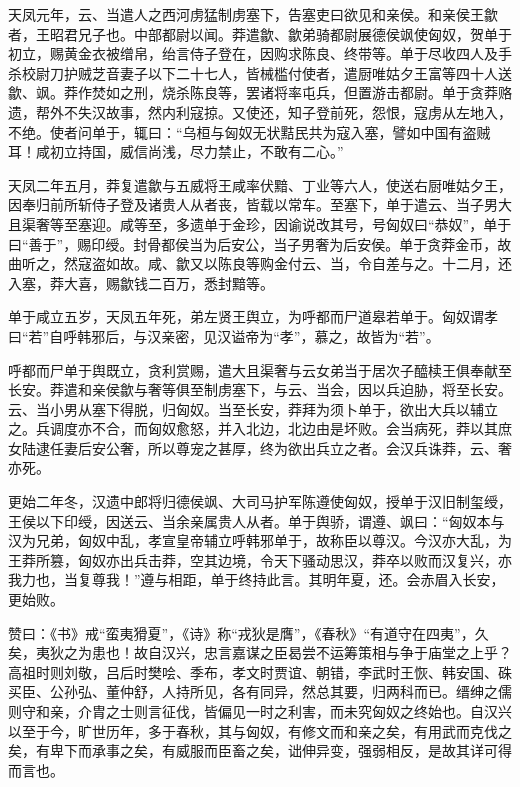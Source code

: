\documentclass[12pt,UTF8]{ctexbook}
\begin{document}
天凤元年，云、当遣人之西河虏猛制虏塞下，告塞吏曰欲见和亲侯。和亲侯王歙者，王昭君兄子也。中部都尉以闻。莽遣歙、歙弟骑都尉展德侯飒使匈奴，贺单于初立，赐黄金衣被缯帛，绐言侍子登在，因购求陈良、终带等。单于尽收四人及手杀校尉刀护贼芝音妻子以下二十七人，皆械槛付使者，遣厨唯姑夕王富等四十人送歙、飒。莽作焚如之刑，烧杀陈良等，罢诸将率屯兵，但置游击都尉。单于贪莽赂遗，帮外不失汉故事，然内利寇掠。又使还，知子登前死，怨恨，寇虏从左地入，不绝。使者问单于，辄曰：“乌桓与匈奴无状黠民共为寇入塞，譬如中国有盗贼耳！咸初立持国，威信尚浅，尽力禁止，不敢有二心。”



天凤二年五月，莽复遣歙与五威将王咸率伏黯、丁业等六人，使送右厨唯姑夕王，因奉归前所斩侍子登及诸贵人从者丧，皆载以常车。至塞下，单于遣云、当子男大且渠奢等至塞迎。咸等至，多遗单于金珍，因谕说改其号，号匈奴曰“恭奴”，单于曰“善于”，赐印绶。封骨都侯当为后安公，当子男奢为后安侯。单于贪莽金币，故曲听之，然寇盗如故。咸、歙又以陈良等购金付云、当，令自差与之。十二月，还入塞，莽大喜，赐歙钱二百万，悉封黯等。



单于咸立五岁，天凤五年死，弟左贤王舆立，为呼都而尸道皋若单于。匈奴谓孝曰“若”自呼韩邪后，与汉亲密，见汉谥帝为“孝”，慕之，故皆为“若”。



呼都而尸单于舆既立，贪利赏赐，遣大且渠奢与云女弟当于居次子醯椟王俱奉献至长安。莽遣和亲侯歙与奢等俱至制虏塞下，与云、当会，因以兵迫胁，将至长安。云、当小男从塞下得脱，归匈奴。当至长安，莽拜为须卜单于，欲出大兵以辅立之。兵调度亦不合，而匈奴愈怒，并入北边，北边由是坏败。会当病死，莽以其庶女陆逮任妻后安公奢，所以尊宠之甚厚，终为欲出兵立之者。会汉兵诛莽，云、奢亦死。



更始二年冬，汉遗中郎将归德侯飒、大司马护军陈遵使匈奴，授单于汉旧制玺绶，王侯以下印绶，因送云、当余亲属贵人从者。单于舆骄，谓遵、飒曰：“匈奴本与汉为兄弟，匈奴中乱，孝宣皇帝辅立呼韩邪单于，故称臣以尊汉。今汉亦大乱，为王莽所篡，匈奴亦出兵击莽，空其边境，令天下骚动思汉，莽卒以败而汉复兴，亦我力也，当复尊我！”遵与相距，单于终持此言。其明年夏，还。会赤眉入长安，更始败。



赞曰：《书》戒“蛮夷猾夏”，《诗》称“戎狄是膺”，《春秋》“有道守在四夷”，久矣，夷狄之为患也！故自汉兴，忠言嘉谋之臣曷尝不运筹策相与争于庙堂之上乎？高祖时则刘敬，吕后时樊哙、季布，孝文时贾谊、朝错，李武时王恢、韩安国、硃买臣、公孙弘、董仲舒，人持所见，各有同异，然总其要，归两科而已。缙绅之儒则守和亲，介胄之士则言征伐，皆偏见一时之利害，而未究匈奴之终始也。自汉兴以至于今，旷世历年，多于春秋，其与匈奴，有修文而和亲之矣，有用武而克伐之矣，有卑下而承事之矣，有威服而臣畜之矣，诎伸异变，强弱相反，是故其详可得而言也。
\end{document}
